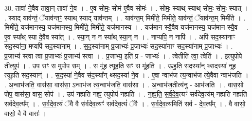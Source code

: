 \documentclass[17pt]{extarticle}
\begin{document}
30. तावा॑ ने॒वैव तावा॒न् तावा॑ ने॒व । . ए॒व सोमः॒ सोम॑ ए॒वैव सोमः॑ । . सोमः॒ स्याथ् स्याथ् सोमः॒ सोमः॒ स्यात् । . स्याद् याव॑न्तं॒ ॅयाव॑न्तꣳ॒॒ स्याथ् स्याद् याव॑न्तम् । . याव॑न्त॒म् मिमी॑ते॒ मिमी॑ते॒ याव॑न्तं॒ ॅयाव॑न्त॒म् मिमी॑ते । . मिमी॑ते॒ यज॑मानस्य॒ यज॑मानस्य॒ मिमी॑ते॒ मिमी॑ते॒ यज॑मानस्य । . यज॑मान स्यै॒वैव यज॑मानस्य॒ यज॑मान स्यै॒व । . ए॒व स्या᳚थ् स्या दे॒वैव स्या᳚त् । . स्या॒न् न न स्या᳚थ् स्या॒न् न । . नाप्यपि॒ न नापि॑ । . अपि॑ सद॒स्या॑नाꣳ सद॒स्या॑ना॒ मप्यपि॑ सद॒स्या॑नाम् । . स॒द॒स्या॑नाम् प्र॒जाभ्यः॑ प्र॒जाभ्यः॑ सद॒स्या॑नाꣳ सद॒स्या॑नाम् प्र॒जाभ्यः॑ । . प्र॒जाभ्य॑ स्त्वा त्वा प्र॒जाभ्यः॑ प्र॒जाभ्य॑ स्त्वा । . प्र॒जाभ्य॒ इति॑ प्र - जाभ्यः॑ । . त्वेतीति॑ त्वा॒ त्वेति॑ । . इत्युपोपे तीत्युप॑ । . उप॒ सꣳ स मुपोप॒ सम् । . स मू॑ह त्यूहति॒ सꣳ स मू॑हति । . ऊ॒ह॒ति॒ स॒द॒स्या᳚न् थ्सद॒स्या॑ नूह त्यूहति सद॒स्यान्॑ । . स॒द॒स्या॑ ने॒वैव स॑द॒स्या᳚न् थ्सद॒स्या॑ ने॒व । . ए॒वा न्वाभ॑ज त्य॒न्वाभ॑ज त्ये॒वैवा न्वाभ॑जति । . अ॒न्वाभ॑जति॒ वास॑सा॒ वास॑सा॒ ऽन्वाभ॑ज त्य॒न्वाभ॑जति॒ वास॑सा । . अ॒न्वाभ॑ज॒तीत्य॑नु - आभ॑जति । . वास॒सो पोप॒ वास॑सा॒ वास॒ सोप॑ । . उप॑ नह्यति नह्य॒ त्युपोप॑ नह्यति । . न॒ह्य॒ति॒ स॒र्व॒दे॒व॒त्यꣳ॑ सर्वदेव॒त्य॑म् नह्यति नह्यति सर्वदेव॒त्य᳚म् । . स॒र्व॒दे॒व॒त्यं॑ ॅवै वै स॑र्वदेव॒त्यꣳ॑ सर्वदेव॒त्यं॑ ॅवै । . स॒र्व॒दे॒व॒त्य॑मिति॑ सर्व - दे॒व॒त्य᳚म् । . वै वासो॒ वासो॒ वै वै वासः॑ । \newline
\end{document}
